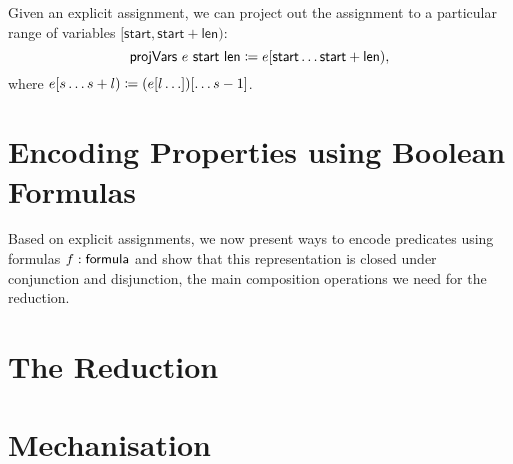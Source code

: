 \newcommand{\projVars}{\textsf{projVars}}
Given an explicit assignment, we can project out the assignment to a particular range of variables $[\textsf{start}, \textsf{start} + \textsf{len})$:
\[\projVars~e~\textsf{start}~\textsf{len} \defeq e[\textsf{start}\ldots\textsf{start}+\textsf{len}),\]
where $e[s\ldots s +l)\coloneqq (e[l\ldots])[\ldots s-1]$.

\section{Encoding Properties using Boolean Formulas}
Based on explicit assignments, we now present ways to encode predicates using formulas $f : \textsf{formula}$ and show that this representation is closed under conjunction and disjunction, the main composition operations we need for the reduction.

\section{The Reduction}

\section{Mechanisation}
